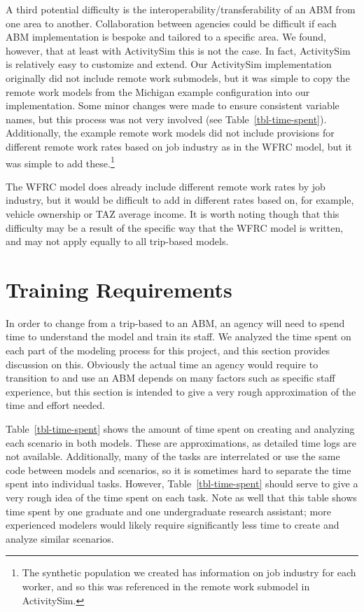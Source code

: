 \documentclass[fancy, twoside, mastersfancy, ms]{byuthesis}
\begin{document}
A third potential difficulty is the interoperability/transferability of
an ABM from one area to another. Collaboration between agencies could be
difficult if each ABM implementation is bespoke and tailored to a
specific area. We found, however, that at least with ActivitySim this is
not the case. In fact, ActivitySim is relatively easy to customize and
extend. Our ActivitySim implementation originally did not include remote
work submodels, but it was simple to copy the remote work models from
the Michigan example configuration into our implementation. Some minor
changes were made to ensure consistent variable names, but this process
was not very involved (see Table~\ref{tbl-time-spent}). Additionally,
the example remote work models did not include provisions for different
remote work rates based on job industry as in the WFRC model, but it was
simple to add these.\footnote{The synthetic population we created has
  information on job industry for each worker, and so this was
  referenced in the remote work submodel in ActivitySim.}

The WFRC model does already include different remote work rates by job
industry, but it would be difficult to add in different rates based on,
for example, vehicle ownership or TAZ average income. It is worth noting
though that this difficulty may be a result of the specific way that the
WFRC model is written, and may not apply equally to all trip-based
models.

\section{Training Requirements}\label{training-requirements}

In order to change from a trip-based to an ABM, an agency will need to
spend time to understand the model and train its staff. We analyzed the
time spent on each part of the modeling process for this project, and
this section provides discussion on this. Obviously the actual time an
agency would require to transition to and use an ABM depends on many
factors such as specific staff experience, but this section is intended
to give a very rough approximation of the time and effort needed.

Table~\ref{tbl-time-spent} shows the amount of time spent on creating
and analyzing each scenario in both models. These are approximations, as
detailed time logs are not available. Additionally, many of the tasks
are interrelated or use the same code between models and scenarios, so
it is sometimes hard to separate the time spent into individual tasks.
However, Table~\ref{tbl-time-spent} should serve to give a very rough
idea of the time spent on each task. Note as well that this table shows
time spent by one graduate and one undergraduate research assistant;
more experienced modelers would likely require significantly less time
to create and analyze similar scenarios.
\end{document}
